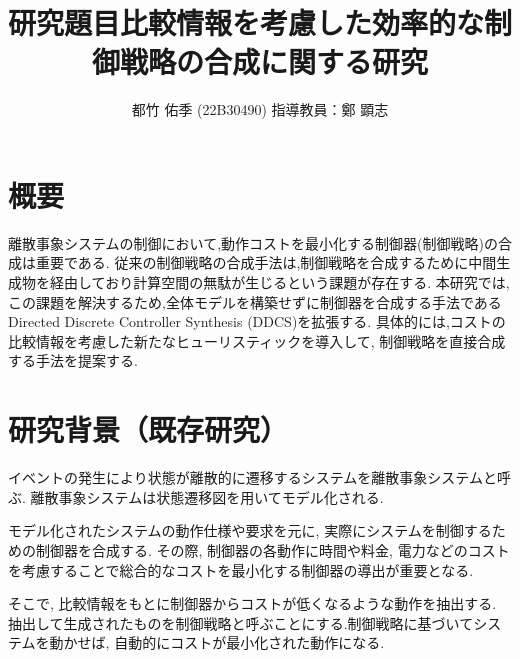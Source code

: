 \documentclass[11pt]{jarticle}
\begin{document}
\title{研究題目}
\title{比較情報を考慮した効率的な制御戦略の合成に関する研究}
\author{都竹 佑季 (22B30490) \;\; 指導教員：鄭 顕志}
\date{\empty} %
\maketitle %
\thispagestyle{fancy}

\section{概要} %
離散事象システムの制御において,動作コストを最小化する制御器(制御戦略)の合成は重要である.
従来の制御戦略の合成手法は,制御戦略を合成するために中間生成物を経由しており計算空間の無駄が生じるという課題が存在する.
本研究では,この課題を解決するため,全体モデルを構築せずに制御器を合成する手法であるDirected Discrete Controller Synthesis (DDCS)\cite{ddcs}を拡張する.
具体的には,コストの比較情報を考慮した新たなヒューリスティックを導入して, 制御戦略を直接合成する手法を提案する.

\section{研究背景（既存研究）}
イベントの発生により状態が離散的に遷移するシステムを離散事象システムと呼ぶ. 離散事象システムは状態遷移図を用いてモデル化される.

モデル化されたシステムの動作仕様や要求を元に, 実際にシステムを制御するための制御器を合成する. その際, 制御器の各動作に時間や料金, 電力などのコストを考慮することで総合的なコストを最小化する制御器の導出が重要となる. 

そこで, 比較情報をもとに制御器からコストが低くなるような動作を抽出する. 抽出して生成されたものを制御戦略と呼ぶことにする.制御戦略に基づいてシステムを動かせば, 自動的にコストが最小化された動作になる.
\end{document}
